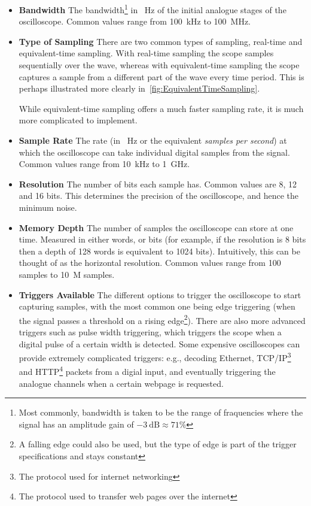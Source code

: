 \begin{itemize}

  \item \textbf{Bandwidth} The bandwidth\footnote{Most commonly, bandwidth is
      taken to be the range of fraquencies where the signal has an amplitude
      gain of $\SI{-3}{\dB}\approx 71\%$} in \SI{}{\Hz} of the initial analogue
      stages of the oscilloscope. Common values range from \SI{100}{\kHz} to
      \SI{100}{\MHz}.

  \item \textbf{Type of Sampling} There are two common types of sampling,
    real-time and equivalent-time sampling. With real-time sampling the scope
    samples sequentially over the wave, whereas with equivalent-time sampling
    the scope captures a sample from a different part of the wave every time
    period. This is perhaps illustrated more clearly
    in~\cref{fig:EquivalentTimeSampling}.

  While equivalent-time sampling offers a much faster sampling rate, it is much
  more complicated to implement.

  \item \textbf{Sample Rate} The rate (in \SI{}{\Hz} or the equivalent
  \textit{samples per second}) at which the oscilloscope can take individual
  digital samples from the signal. Common values range from \SI{10}{\kHz} to
  \SI{1}{\GHz}.

  \item \textbf{Resolution} The number of bits each sample has. Common values
  are 8, 12 and 16 bits. This determines the precision of the oscilloscope, and
  hence the minimum noise.

  \item \textbf{Memory Depth} The number of samples the oscilloscope can store
  at one time. Measured in either words, or bits (for example, if the resolution
  is 8 bits then a depth of 128 words is equivalent to 1024 bits). Intuitively,
  this can be thought of as the horizontal resolution. Common values range from
  100 samples to \SI{10}{M} samples.

  \item \textbf{Triggers Available} The different options to trigger the
    oscilloscope to start capturing samples, with the most common one being edge
    triggering \autocite{PicotechTriggers} (when the signal passes a threshold
    on a rising edge\footnote{A falling edge could also be used, but the type of
    edge is part of the trigger specifications and stays constant}). There are
    also more advanced triggers such as pulse width triggering, which triggers
    the scope when a digital pulse of a certain width is detected. Some
    expensive oscilloscopes can provide extremely complicated triggers: e.g.,
    decoding Ethernet, TCP/IP\footnote{The protocol used for internet
    networking} and HTTP\footnote{The protocol used to transfer web pages over
    the internet} packets from a digial input, and eventually triggering the
    analogue channels when a certain webpage is requested.


\end{itemize}
